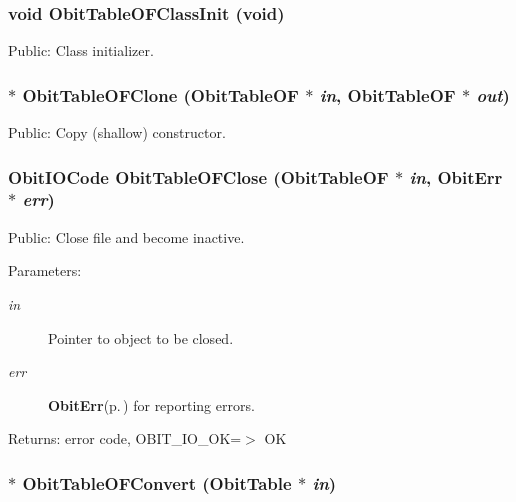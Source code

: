 \subsubsection{\setlength{\rightskip}{0pt plus 5cm}void Obit\-Table\-OFClass\-Init (void)}\label{ObitTableOF_8h_a10}


Public: Class initializer. 

\subsubsection{$\ast$ Obit\-Table\-OFClone ({\bf Obit\-Table\-OF} $\ast$ {\em in}, {\bf Obit\-Table\-OF} $\ast$ {\em out})}\label{ObitTableOF_8h_a15}


Public: Copy (shallow) constructor. 

\subsubsection{\setlength{\rightskip}{0pt plus 5cm}Obit\-IOCode Obit\-Table\-OFClose ({\bf Obit\-Table\-OF} $\ast$ {\em in}, {\bf Obit\-Err} $\ast$ {\em err})}\label{ObitTableOF_8h_a21}


Public: Close file and become inactive. 

\begin{Desc}
\item[Parameters:]
\begin{description}
\item[{\em in}]Pointer to object to be closed. \item[{\em err}]{\bf Obit\-Err}{\rm (p.\,\pageref{structObitErr})} for reporting errors. \end{description}
\end{Desc}
\begin{Desc}
\item[Returns:]error code, OBIT\_\-IO\_\-OK=$>$ OK \end{Desc}
\subsubsection{$\ast$ Obit\-Table\-OFConvert ({\bf Obit\-Table} $\ast$ {\em in})}\label{ObitTableOF_8h_a16}


